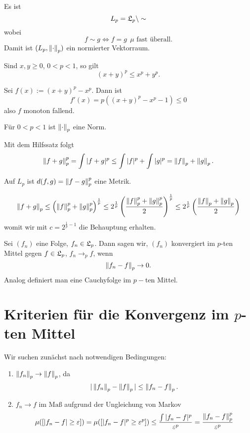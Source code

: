 	\begin{defi}
		Es ist 
		\[ L_p=\mathfrak{L}_p\setminus\sim \]
		wobei 
		\[ f\sim g\Leftrightarrow f=g\:\:\mu\text{ fast überall}. \]
		Damit ist $(L_p, \left\|\cdot\right\|_p)$ ein normierter Vektorraum. 
	\end{defi}

	\begin{lemma}[Hilfssatz]
		Sind $x,y\ge 0$, $0<p<1$, so gilt
		\[ (x+y)^p\le x^p+y^p. \]
	\end{lemma}

	\begin{bew}
		Sei $f(x):= (x+y)^p-x^p$. Dann ist
		\[ f'(x)=p((x+y)^p-x^p-1)\le 0 \]
		also $f$ monoton fallend. 
	\end{bew}

	\begin{satz}
		Für $0<p<1$ ist $\left\|\cdot\right\|_p$ eine Norm.
	\end{satz}

	\begin{bew}
		Mit dem Hilfssatz folgt
		\[ \left\|f+g\right\|_p^p=\int|f+g|^p\le\int |f|^p+\int|g|^p = \left\|f\right\|_p+\left\|g\right\|_p. \]
	\end{bew}
	
	\begin{satz}
		Auf $L_p$ ist $d(f,g)=\left\|f-g\right\|_p^p$ eine Metrik.
	\end{satz}

	\begin{bew}
		\[ \left\|f+g\right\|_p\le \left(\left\|f\right\|_p^p+\left\|g\right\|_p^p\right)^\frac{1}{p}\le 2^\frac{1}{p}\left(\frac{\left\|f\right\|_p^p+\left\|g\right\|_p^p}{2}\right)^\frac{1}{p}\le 2^\frac{1}{p}\left(\frac{\left\|f\right\|_p+\left\|g\right\|_p}{2}\right) \]
		womit wir mit $c=2^{\frac{1}{p}-1}$ die Behauptung erhalten.
	\end{bew}

	\begin{defi}
		Sei $(f_n)$ eine Folge, $f_n\in\mathfrak{L}_p$. Dann sagen wir, $(f_n)$ konvergiert im $p$-ten Mittel gegen $f\in\mathfrak{L}_p$, $f_n\to_p f$, wenn 
		\[ \left\|f_n-f\right\|_p\to 0. \]
		Analog definiert man eine Cauchyfolge im $p-$ten Mittel. 
	\end{defi}

\section{Kriterien für die Konvergenz im $p$-ten Mittel}
	Wir suchen zunächst nach notwendigen Bedingungen:
	\begin{enumerate}
		\item $\left\|f_n\right\|_p\to\left\|f\right\|_p$, da 
		\[ |\left\|f_n\right\|_p-\left\|f\right\|_p|\le \left\|f_n-f\right\|_p. \]
		\item $f_n\to f \text{ im Maß}$ aufgrund der Ungleichung von Markov
		\[ \mu([|f_n-f|\ge \varepsilon])=\mu([|f_n-f|^p\ge \varepsilon^p])\le\frac{\int|f_n-f|^p}{\varepsilon^p}=\frac{\left\|f_n-f\right\|_p^p}{\varepsilon^p} \]
	\end{enumerate}

